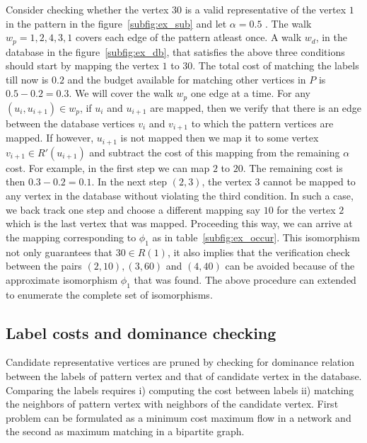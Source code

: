 Consider checking whether the vertex $30$ is a valid representative of the vertex
$1$ in the pattern in the figure~\ref{subfig:ex_sub} and let $\alpha = 0.5$ . The
walk $ w_p = 1, 2, 4, 3, 1$ covers each edge of the pattern atleast once. A
walk $w_d$, in the database in the figure~\ref{subfig:ex_db}, 
that satisfies the above three conditions should start by mapping the
vertex $1$ to $30$. The total cost of matching the labels till now is $0.2$ and
the budget available for matching other vertices in $P$ is $0.5 - 0.2 = 0.3$.
We will cover the walk $w_p$ one edge at a time. For any $(u_i, u_{i+1}) \in
w_p$, if $u_i$ and $u_{i+1}$ are mapped, then we verify that there is an edge
between the database vertices $v_i$ and $v_{i+1}$ to which the pattern vertices
are mapped.  If however, $u_{i+1}$ is not mapped then we map it to some vertex
$v_{i+1} \in R'(u_{i+1})$ and subtract the cost of this mapping from the
remaining $\alpha$ cost.  For example, in the first step we can map $2$ to $20$.
The remaining cost is then $0.3 - 0.2 = 0.1$. In the next step $(2,3)$, the
vertex $3$ cannot be mapped to any vertex in the database without violating the
third condition.  In such a case, we back track one step and choose a different
mapping say $10$ for the vertex $2$ which is the last vertex that was mapped.
Proceeding this way, we can arrive at the mapping corresponding to $\phi_{1}$ as
in table~\ref{subfig:ex_occur}.  This isomorphism not only guarantees that $30
\in R(1)$, it also implies that the verification check between the pairs $(2,
10), (3, 60)$ and $(4, 40)$ can be avoided because of the approximate isomorphism
$\phi_1$ that was found.  The above procedure can extended to enumerate the
complete set of isomorphisms.



\subsection{Label costs and dominance checking} \label{sec:labelcheck} 
Candidate representative vertices are pruned by checking for dominance 
relation between the \ncl labels of pattern vertex and that of candidate
vertex in the database. Comparing the \ncl labels requires i) computing the
cost between \khop labels ii) matching the neighbors of pattern vertex 
with neighbors of the candidate vertex. First problem can be formulated
as a minimum cost maximum flow in a network and the second as maximum matching
in a bipartite graph.

